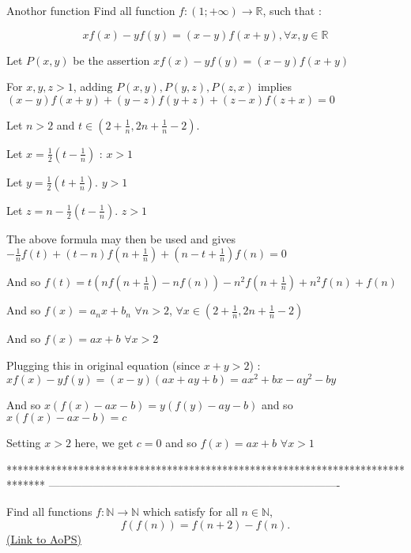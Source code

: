 \begin{solution}
	\begin{tcolorbox}Anothor function
Find all function $f : (1;+\infty)\to\mathbb{R}$, such that :

\[ xf(x) - yf(y) = (x-y)f(x+y), \forall x, y \in \mathbb{R} \]\end{tcolorbox}
Let $P(x,y)$ be the assertion $xf(x)-yf(y)=(x-y)f(x+y)$

For $x,y,z>1$, adding $P(x,y), P(y,z), P(z,x)$ implies $(x-y)f(x+y)+(y-z)f(y+z)+(z-x)f(z+x)=0$

Let $n>2$ and $t\in\left(2+\frac 1n,2n+\frac 1n-2\right)$.

Let $x=\frac 12(t-\frac 1n)$ : $x>1$

Let $y=\frac 12(t+\frac 1n)$. $y>1$

Let $z=n-\frac 12(t-\frac 1n)$. $z>1$

The above formula may then be used and gives $-\frac 1nf(t)+(t-n)f(n+\frac 1n)+(n-t+\frac 1n)f(n)=0$

And so $f(t)=t(nf(n+\frac 1n)-nf(n)) -n^2f(n+\frac 1n)+n^2f(n)+f(n)$

And so $f(x)=a_nx+b_n$ $\forall n>2$, $\forall x\in\left(2+\frac 1n,2n+\frac 1n-2\right)$

And so $f(x)=ax+b$ $\forall x>2$


Plugging this in original equation (since $x+y>2$) : $xf(x)-yf(y)=(x-y)(ax+ay+b)=ax^2+bx-ay^2-by$

And so $x(f(x)-ax-b)=y(f(y)-ay-b)$ and so $x(f(x)-ax-b)=c$

Setting $x>2$ here, we get $c=0$ and so $\boxed{f(x)=ax+b}$ $\forall x>1$
\end{solution}
*******************************************************************************
-------------------------------------------------------------------------------

\begin{problem}
	Find all functions $f: \mathbb N \to \mathbb N$ which satisfy for all $n \in \mathbb N$,
\[f(f(n))=f(n+2)-f(n).\]
	\flushright \href{https://artofproblemsolving.com/community/c6h443227}{(Link to AoPS)}
\end{problem}



